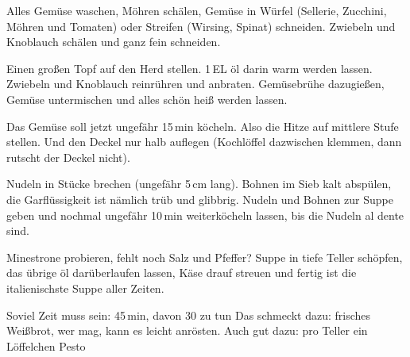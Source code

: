 \begin{Notes}
\item Alles Gem\"{u}se waschen, M\"{o}hren sch\"{a}len, Gem\"{u}se in W\"{u}rfel (Sellerie, Zucchini, M\"{o}hren und Tomaten) oder Streifen (Wirsing, Spinat) schneiden. Zwiebeln und Knoblauch sch\"{a}len und ganz fein schneiden.
\item Einen gro{\ss}en Topf auf den Herd stellen. 1\,EL \"{o}l darin warm werden lassen. Zwiebeln und Knoblauch reinr\"{u}hren und anbraten. Gem\"{u}sebr\"{u}he dazugie{\ss}en, Gem\"{u}se untermischen und alles sch\"{o}n hei{\ss} werden lassen.
\item Das Gem\"{u}se soll jetzt ungef\"{a}hr 15\,min k\"{o}cheln. Also die Hitze auf mittlere Stufe stellen. Und den Deckel nur halb auflegen (Kochl\"{o}ffel dazwischen klemmen, dann rutscht der Deckel nicht).
\item Nudeln in St\"{u}cke brechen (ungef\"{a}hr 5\,cm lang). Bohnen im Sieb kalt absp\"{u}len, die Garfl\"{u}ssigkeit ist n\"{a}mlich tr\"{u}b und glibbrig. Nudeln und Bohnen zur Suppe geben und nochmal ungef\"{a}hr 10\,min weiterk\"{o}cheln lassen, bis die Nudeln al dente sind.
\item Minestrone probieren, fehlt noch Salz und Pfeffer? Suppe in tiefe Teller sch\"{o}pfen, das \"{u}brige \"{o}l dar\"{u}berlaufen lassen, K\"{a}se drauf streuen und fertig ist die italienischste Suppe aller Zeiten.
\end{Notes}

Soviel Zeit muss sein: 45\,min, davon 30 zu tun
Das schmeckt dazu: frisches Wei{\ss}brot, wer mag, kann es leicht anr\"{o}sten. Auch gut dazu: pro Teller ein L\"{o}ffelchen Pesto
\newpage
